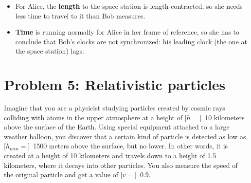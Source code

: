 \documentclass[pagesize,headsepline,10pt,parskip=half]{scrreprt}
\newcommand{\cmark}{\, \text{\ding{51}}}
\newcommand{\strong}[1]{\textbf{#1}}
\newcommand{\const}[1]{\mathrm{#1}}
\renewcommand{\c}{\const{c}}
\begin{document}
\begin{enumerate}[(a)]
\begin{samepage}
            \begin{itemize}
              \item For Alice, the \strong{length} to the space station is
                length-contracted, so she needs less time to travel to it
                than Bob measures. \cmark
              \item \strong{Time} is running normally for Alice in her frame of reference, so
                she has to conclude that Bob's clocks are not synchronized:
                his leading clock (the one at the space station) lags. \cmark
            \end{itemize}
          \end{samepage}
      \end{enumerate}

    \section{Problem 5: Relativistic particles}
      Imagine that you are a physicist studying particles created by cosmic rays
      colliding with atoms in the upper atmosphere at a height of [$h = $]~10 kilometers
      above the surface of the Earth. Using special equipment attached to a large
      weather balloon, you discover that a certain kind of particle is detected
      as low as [$ h_{min} =$]~1500 meters above the surface, but no lower.
      In other words, it is created at a height of 10 kilometers and travels down
      to a height of 1.5 kilometers, where it decays into other particles. You
      also measure the speed of the original particle and get a value of
      [$v =$]~\SI{0.9}{\c}.
\end{document}
